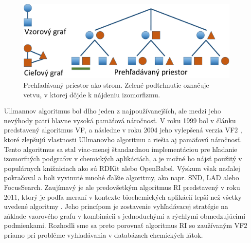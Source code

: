 \documentclass[slovak]{ExcelAtFIT} %
\begin{document}
\begin{figure}[!htb]
	\centering
	\includegraphics[width=1\linewidth]{images/ss_search_tree.pdf}
	\caption{Prehľadávaný priestor ako strom. Zelené podtrhnutie označuje vetvu, v ktorej dôjde k nájdeniu izomorfizmu. \cite{ri}}
	\label{fig:search_space_tree}
\end{figure}

Ullmannov algoritmus bol dlho jeden z naj\-po\-uží\-va\-nej\-ších, ale medzi jeho nevýhody patrí hlavne vysoká pamäťová náročnosť. V roku 1999 bol v článku \cite{vf} predstavený algoritmus VF, a následne v roku 2004 jeho vylepšená verzia VF2 \cite{vf2}, ktoré zlepšujú vlastnosti Ullmanovho algoritmu a riešia aj pamäťovú náročnosť. Tento algoritmus sa stal viac-menej štandardnou implementáciou pre hľadanie izomorfných podgrafov v chemických aplikáciách, a je možné ho nájsť použitý v populárnych knižniciach ako sú RDKit alebo OpenBabel. Výskum však naďalej pokračoval a boli vyvinuté mnohé ďalšie algoritmy, ako napr. SND, LAD alebo FocusSearch. Zaujímavý je ale predovšetkým algoritmus RI predstavený v roku 2011, ktorý je podľa meraní v kontexte biochemických aplikácií lepší než všetky uvedené algoritmy \cite{ri}. Jeho princípom je zostavenie vyhľadávacej stratégie na základe vzorového grafu v kombinácii s jednoduchými a rýchlymi obmedzujúcimi podmienkami. Rozhodli sme sa preto porovnať algoritmus RI so zaužívaným VF2 priamo pri probléme vyhľadávania v databázach chemických látok.
\end{document}
